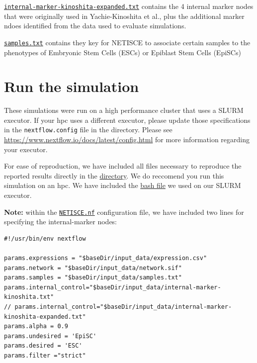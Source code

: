 \documentclass[
]{book}
\begin{document}
\href{https://github.com/VeraLiconaResearchGroup/Netisce/blob/main/ipsc_validation/input_data/internal-marker-kinoshita-expanded.txt}{\texttt{internal-marker-kinoshita-expanded.txt}} contains the 4 internal marker nodes that were originally used in Yachie-Kinoshita et al., plus the additional marker ndoes identified from the data used to evaluate simulations.

\href{https://github.com/VeraLiconaResearchGroup/Netisce/blob/main/ipsc_validation/input_data/samples.txt}{\texttt{samples.txt}} contains they key for NETISCE to associate certain samples to the phenotypes of Embryonic Stem Cells (ESCs) or Epiblast Stem Cells (EpiSCs)

\hypertarget{run-the-simulation-1}{%
\section{Run the simulation}\label{run-the-simulation-1}}

These simulations were run on a high performance cluster that uses a SLURM executor. If your hpc uses a different executor, please update those specifications in the \texttt{nextflow.config} file in the directory. Please see \url{https://www.nextflow.io/docs/latest/config.html} for more information regarding your executor.

For ease of reproduction, we have included all files necessary to reproduce the reported results directly in the \href{https://github.com/VeraLiconaResearchGroup/Netisce/tree/main/ipsc_validation}{directory}. We do reccomend you run this simulation on an hpc. We have included the \href{https://github.com/VeraLiconaResearchGroup/Netisce/blob/main/ipsc_validation/run.sh}{bash file} we used on our SLURM executor.

\textbf{Note: } within the \href{https://github.com/VeraLiconaResearchGroup/Netisce/blob/main/ipsc_validation/NETISCE.nf}{\texttt{NETISCE.nf}} configuration file, we have included two lines for specifying the internal-marker nodes:

\begin{verbatim}
#!/usr/bin/env nextflow

params.expressions = "$baseDir/input_data/expression.csv"
params.network = "$baseDir/input_data/network.sif"
params.samples = "$baseDir/input_data/samples.txt"
params.internal_control="$baseDir/input_data/internal-marker-kinoshita.txt"
// params.internal_control="$baseDir/input_data/internal-marker-kinoshita-expanded.txt"
params.alpha = 0.9
params.undesired = 'EpiSC'
params.desired = 'ESC'
params.filter ="strict"
\end{verbatim}
\end{document}
